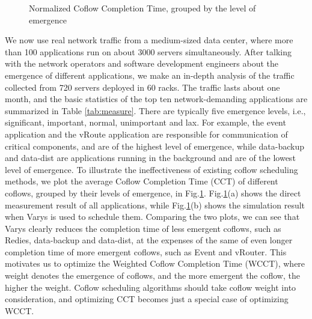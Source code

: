 \documentclass[10pt, conference, letterpaper]{IEEEtran}
\begin{document}
\begin{figure}[!t]
\centering
{}
\hspace{0.1in}
\hspace{0.1in}
\caption{Normalized Coflow Completion Time, grouped by the level of emergence}
\label{motivation_fig}
\vspace{-0.1 in}
\end{figure}

We now use real network traffic from a medium-sized data center, where more than 100 applications run on about 3000 servers simultaneously. After talking with the network operators and software development engineers about the emergence of different applications, we make an in-depth analysis of the traffic collected from 720 servers deployed in 60 racks. The traffic lasts about one month, and the basic statistics of the top ten network-demanding applications are summarized in Table \ref{tab:measure}. There are typically five emergence levels, i.e., significant, important, normal, unimportant and lax. For example, the event application and the vRoute application are responsible for communication of critical components, and are of the highest level of emergence, while data-backup and data-dist are  applications running in the background and are of the lowest level of emergence. 
To illustrate the ineffectiveness of existing coflow scheduling methods, we plot the average Coflow Completion Time (CCT) of different coflows, grouped by their levels of emergence, in Fig.\ref{motivation_fig}. Fig.\ref{motivation_fig}(a) shows the direct measurement result of all applications, while Fig.\ref{motivation_fig}(b) shows the simulation result when Varys is used to schedule them. Comparing the two plots, we can see that Varys clearly reduces the completion time of less emergent coflows, such as Redies, data-backup and data-dist, at the expenses of the same of even longer completion time of more emergent coflows, such as Event and vRouter. This motivates us to optimize the Weighted Coflow Completion Time (WCCT), where weight denotes the emergence of coflows, and the more emergent the coflow, the higher the weight. Coflow scheduling algorithms should take coflow weight into consideration, and optimizing CCT becomes just a special case of optimizing WCCT.
\end{document}
